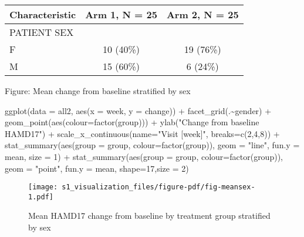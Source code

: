 \documentclass[
  letterpaper,
  DIV=11,
  numbers=noendperiod]{scrreprt}
\newenvironment{Shaded}{\begin{snugshade}}{\end{snugshade}}
\newcommand{\AttributeTok}[1]{\textcolor[rgb]{0.40,0.45,0.13}{#1}}
\newcommand{\DecValTok}[1]{\textcolor[rgb]{0.68,0.00,0.00}{#1}}
\newcommand{\FunctionTok}[1]{\textcolor[rgb]{0.28,0.35,0.67}{#1}}
\newcommand{\NormalTok}[1]{\textcolor[rgb]{0.00,0.23,0.31}{#1}}
\newcommand{\SpecialCharTok}[1]{\textcolor[rgb]{0.37,0.37,0.37}{#1}}
\newcommand{\StringTok}[1]{\textcolor[rgb]{0.13,0.47,0.30}{#1}}
\begin{document}
\begin{longtable}[]{@{}lcc@{}}
\toprule\noalign{}
\textbf{Characteristic} & \textbf{Arm 1}, N = 25 & \textbf{Arm 2}, N =
25 \\
\midrule\noalign{}
\endhead
\bottomrule\noalign{}
\endlastfoot
PATIENT SEX & & \\
F & 10 (40\%) & 19 (76\%) \\
M & 15 (60\%) & 6 (24\%) \\
\end{longtable}

Figure: Mean change from baseline stratified by sex

\begin{Shaded}
\begin{Highlighting}[]
\FunctionTok{ggplot}\NormalTok{(}\AttributeTok{data =}\NormalTok{ all2, }\FunctionTok{aes}\NormalTok{(}\AttributeTok{x =}\NormalTok{ week, }\AttributeTok{y =}\NormalTok{ change)) }\SpecialCharTok{+}  \FunctionTok{facet\_grid}\NormalTok{(.}\SpecialCharTok{\textasciitilde{}}\NormalTok{gender) }\SpecialCharTok{+}
  \FunctionTok{geom\_point}\NormalTok{(}\FunctionTok{aes}\NormalTok{(}\AttributeTok{colour=}\FunctionTok{factor}\NormalTok{(group))) }\SpecialCharTok{+} \FunctionTok{ylab}\NormalTok{(}\StringTok{"Change from baseline HAMD17"}\NormalTok{) }\SpecialCharTok{+}
  \FunctionTok{scale\_x\_continuous}\NormalTok{(}\AttributeTok{name=}\StringTok{"Visit [week]"}\NormalTok{, }\AttributeTok{breaks=}\FunctionTok{c}\NormalTok{(}\DecValTok{2}\NormalTok{,}\DecValTok{4}\NormalTok{,}\DecValTok{8}\NormalTok{)) }\SpecialCharTok{+}
  \FunctionTok{stat\_summary}\NormalTok{(}\FunctionTok{aes}\NormalTok{(}\AttributeTok{group =}\NormalTok{ group, }\AttributeTok{colour=}\FunctionTok{factor}\NormalTok{(group)), }\AttributeTok{geom =} \StringTok{"line"}\NormalTok{, }\AttributeTok{fun.y =}\NormalTok{ mean,}
               \AttributeTok{size =} \DecValTok{1}\NormalTok{) }\SpecialCharTok{+}
  \FunctionTok{stat\_summary}\NormalTok{(}\FunctionTok{aes}\NormalTok{(}\AttributeTok{group =}\NormalTok{ group, }\AttributeTok{colour=}\FunctionTok{factor}\NormalTok{(group)), }\AttributeTok{geom =} \StringTok{"point"}\NormalTok{, }\AttributeTok{fun.y =}\NormalTok{ mean,}
               \AttributeTok{shape=}\DecValTok{17}\NormalTok{,}\AttributeTok{size =} \DecValTok{2}\NormalTok{)}
\end{Highlighting}
\end{Shaded}

\begin{figure}[H]

{\centering \texttt{[image: s1\_visualization\_files/figure-pdf/fig-meansex-1.pdf]}

}

\caption{\label{fig-meansex}Mean HAMD17 change from baseline by
treatment group stratified by sex}

\end{figure}
\end{document}
